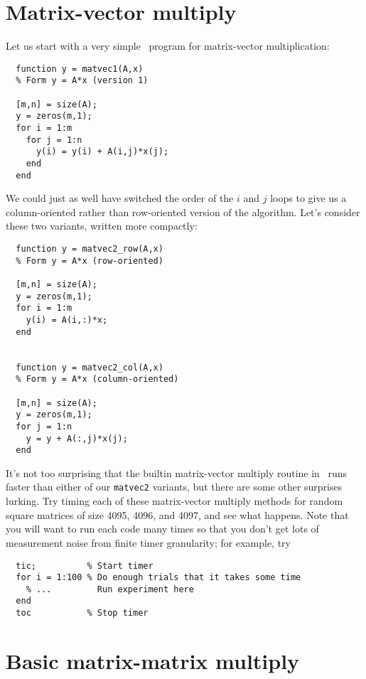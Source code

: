 \documentclass[12pt, leqno]{article}
\begin{document}
\section*{Matrix-vector multiply}

Let us start with a very simple \matlab\ program for matrix-vector
multiplication:
\begin{verbatim}
  function y = matvec1(A,x)
  % Form y = A*x (version 1)

  [m,n] = size(A);
  y = zeros(m,1);
  for i = 1:m
    for j = 1:n
      y(i) = y(i) + A(i,j)*x(j);
    end
  end
\end{verbatim}
We could just as well have switched the order of the $i$ and $j$ loops
to give us a column-oriented rather than row-oriented version of the algorithm.
Let's consider these two variants, written more compactly:
\begin{verbatim}
  function y = matvec2_row(A,x)
  % Form y = A*x (row-oriented)

  [m,n] = size(A);
  y = zeros(m,1);
  for i = 1:m
    y(i) = A(i,:)*x;
  end


  function y = matvec2_col(A,x)
  % Form y = A*x (column-oriented)

  [m,n] = size(A);
  y = zeros(m,1);
  for j = 1:n
    y = y + A(:,j)*x(j);
  end
\end{verbatim}

It's not too surprising that the builtin matrix-vector multiply routine in
\matlab\ runs faster than either of our {\tt matvec2} variants, but there
are some other surprises lurking.  Try timing each of these matrix-vector
multiply methods for random square matrices of size 4095, 4096, and 4097,
and see what happens.  Note that you will want to run each code many times
so that you don't get lots of measurement noise from finite timer granularity;
for example, try
\begin{verbatim}
  tic;          % Start timer
  for i = 1:100 % Do enough trials that it takes some time
    % ...         Run experiment here
  end
  toc           % Stop timer
\end{verbatim}


\section*{Basic matrix-matrix multiply}
\end{document}
